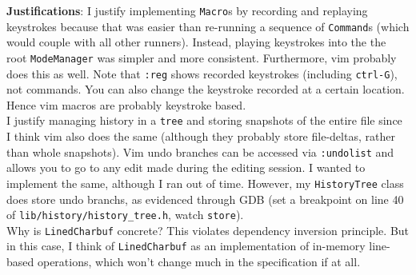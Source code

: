 \documentclass{article}
\begin{document}
\textbf{Justifications}: I justify implementing \texttt{Macro}s 
by recording and replaying keystrokes because that was easier than 
re-running a sequence of \texttt{Command}s 
(which would couple with all other runners). Instead, playing keystrokes into the 
the root \texttt{ModeManager} was simpler and more consistent. 
Furthermore, vim probably does this as well. Note that \texttt{:reg} 
shows recorded keystrokes (including \texttt{ctrl-G}), not commands. 
You can also change the keystroke recorded at a certain location. 
Hence vim macros are probably keystroke based. 
\\I justify managing history in a \texttt{tree} and storing snapshots 
of the entire file since I think vim also does the same 
(although they probably store file-deltas, rather than whole snapshots). 
Vim undo branches can be accessed via \texttt{:undolist} 
and allows you to go to any edit made during the editing session. 
I wanted to implement the same, although I ran out of time. 
However, my \texttt{HistoryTree} class does store undo branchs, 
as evidenced through GDB 
(set a breakpoint on line 40 of \texttt{lib/history/history\_tree.h}, 
watch \texttt{store}). 
\\Why is \texttt{LinedCharbuf} concrete? This violates dependency inversion principle. 
But in this case, 
I think of \texttt{LinedCharbuf} as an implementation of in-memory line-based operations, 
which won't change much in the specification if at all. 
\end{document}
